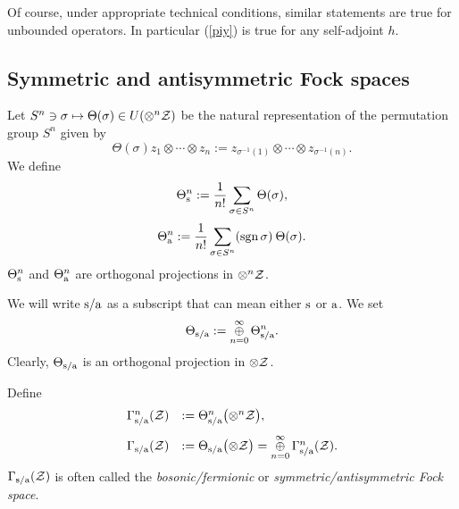 \documentclass{svmult}
\def\bet{\begin{theorem}}
\def\eet{\end{theorem}}
\def\kk{{\mathbb K}}
\def\s{{\rm s}}
\def\sa{{\rm s/a}}
\def\cZ{{\cal Z}}
\def\a{{\rm a}}
\def\loplus{\mathop{\oplus}\limits}
\def\sgn{{\rm sgn}}
\def\d{{\rm d}}
\def\loplus{\mathop{\oplus}\limits}
\def\sgn{{\rm sgn}}
\def\d{{\rm d}}
\def\s{{\rm s}}
\begin{document}
 Of
course, under appropriate technical conditions, similar statements are true
for unbounded operators. In particular (\ref{piy}) is true for any
self-adjoint $h$.












 \subsection{Symmetric and antisymmetric Fock spaces}
\label{s.sym} 
 

Let
$S^n\ni\sigma\mapsto
 \Theta(\sigma)\in U(\otimes^n\cZ)$
be the natural representation of the permutation
 group $S^n$ given by
\[\Theta(\sigma)z_1\otimes\cdots\otimes z_n:=z_{\sigma^{-1}(1)}\otimes
\cdots\otimes
z_{\sigma^{-1}(n)}.\]
 We define
 \[\Theta_\s^n:=\frac{1}{n!}\sum_{\sigma\in S^n}\Theta(\sigma)
,\]
 \[\Theta_\a^n:=\frac{1}{n!}\sum_{\sigma\in S^n}(\sgn\,\sigma)\:\Theta(\sigma)
.\]
 $\Theta_\s^n$ and $\Theta_\a^n $ are orthogonal
 projections in $\otimes^n \cZ$.


We will write $\sa$ as a subscript that can mean either $\s$ or $\a$.
We set
\[\Theta_\sa:=\loplus_{n=0}^\infty\Theta_\sa^n.\]
Clearly, $\Theta_\sa$ is an orthogonal projection in $\otimes\cZ$.

Define
\[ \begin{array}{rl}
\Gamma_\sa^n(\cZ)&:=\Theta_\sa^n\bigl(\otimes^n\cZ\bigr),\\[3mm]
\Gamma_\sa(\cZ)&:=\Theta_\sa\bigl(\otimes\cZ\bigr)=
\loplus_{n=0}^\infty\Gamma_\sa^n(\cZ).\end{array}\]
$\Gamma_\sa(\cZ)$ is often called the {\em bosonic/fermionic} or
{\em symmetric/antisymmetric  Fock space}. 
\end{document}
